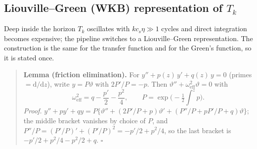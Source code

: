 \documentclass[11pt,a4paper]{article}
\newcommand{\dd}{\mathrm{d}}
\newcommand{\om}{\omega_{\mathrm{eff}}}
\theoremstyle{remark}
\begin{document}
\subsection{Liouville--Green (WKB) representation of \texorpdfstring{$T_k$}{Tk}}
\label{sec:Tk-LG}

Deep inside the horizon $T_k$ oscillates with $kc_s\eta\gg1$ cycles and direct integration becomes expensive; the pipeline switches to a Liouville--Green representation. The construction is the same for the transfer function and for the Green's function, so it is stated once.

\begin{quote}
\textbf{Lemma (friction elimination).} For $y'' + p(z)\,y' + q(z)\,y = 0$ (primes $=\dd/\dd z$), write $y = P\vartheta$ with $2P'/P = -p$. Then $\vartheta'' + \om^2\vartheta = 0$ with
\begin{equation}
\om^2 = q - \frac{p'}{2} - \frac{p^2}{4},
\qquad
P = \exp\Big(-\tfrac12\!\int^z p\Big).
\label{eq:LG-lemma}
\end{equation}
\emph{Proof.} $y'' + py' + qy = P\{\vartheta'' + (2P'/P + p)\vartheta' + (P''/P + pP'/P + q)\vartheta\}$; the middle bracket vanishes by choice of $P$, and $P''/P = (P'/P)' + (P'/P)^2 = -p'/2 + p^2/4$, so the last bracket is $-p'/2 + p^2/4 - p^2/2 + q$. $\square$
\end{quote}
\end{document}

